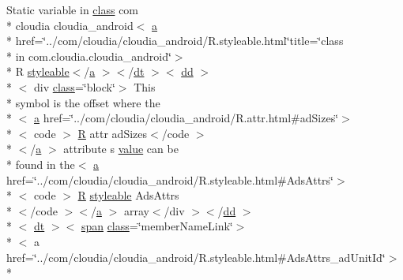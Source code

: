 \begin{DoxyCompactItemize}
 Static variable in \hyperlink{_tools_8html_acf06f836132665ba8114f5a414c2403f}{class} com \\*
cloudia cloudia\-\_\-android$<$ \hyperlink{style_8css_a5e8981582017bb8b84c21f148345d1f7}{a} \\*
href=\char`\"{}../com/cloudia/cloudia\-\_\-android/R.\-styleable.\-html\char`\"{}title=\char`\"{}class \\*
in com.\-cloudia.\-cloudia\-\_\-android\char`\"{}$>$\\*
 R \hyperlink{index-17_8html_ae6c9bf1e41380184b4b665ca9ab6ba0a}{styleable}$<$/\hyperlink{style_8css_a5e8981582017bb8b84c21f148345d1f7}{a} $>$$<$/\hyperlink{stylesheet_8css_a107565fb4039d33b041380d6e0ea1d80}{dt} $>$$<$ \hyperlink{stylesheet_8css_a47f4718a86835a7771ec592ece845221}{dd} $>$\\*
$<$ div \hyperlink{_tools_8html_acf06f836132665ba8114f5a414c2403f}{class}=\char`\"{}block\char`\"{}$>$ This \\*
symbol is the offset where the\\*
$<$ \hyperlink{style_8css_a5e8981582017bb8b84c21f148345d1f7}{a} href=\char`\"{}../com/cloudia/cloudia\-\_\-android/R.\-attr.\-html\#ad\-Sizes\char`\"{}$>$\\*
$<$ code $>$ \hyperlink{index-16_8html_a31e8fe59be5c20ce90a0090e28a0c1fe}{R} attr ad\-Sizes$<$/code $>$\\*
$<$/\hyperlink{style_8css_a5e8981582017bb8b84c21f148345d1f7}{a} $>$ attribute s \hyperlink{_my_s_q_l_connector_8measure_8html_afcc7a4b78ecd8fa7e713f8cfa0f51017}{value} can be \\*
found in the$<$ \hyperlink{style_8css_a5e8981582017bb8b84c21f148345d1f7}{a} href=\char`\"{}../com/cloudia/cloudia\-\_\-android/R.\-styleable.\-html\#Ads\-Attrs\char`\"{}$>$\\*
$<$ code $>$ \hyperlink{index-16_8html_a31e8fe59be5c20ce90a0090e28a0c1fe}{R} \hyperlink{index-17_8html_ae6c9bf1e41380184b4b665ca9ab6ba0a}{styleable} Ads\-Attrs\\*
$<$/code $>$$<$/\hyperlink{style_8css_a5e8981582017bb8b84c21f148345d1f7}{a} $>$ array$<$/div $>$$<$/\hyperlink{stylesheet_8css_a47f4718a86835a7771ec592ece845221}{dd} $>$\\*
$<$ \hyperlink{stylesheet_8css_a107565fb4039d33b041380d6e0ea1d80}{dt} $>$$<$ \hyperlink{stylesheet_8css_a8343996ebcf16220b04e54659aac31cc}{span} \hyperlink{_tools_8html_acf06f836132665ba8114f5a414c2403f}{class}=\char`\"{}member\-Name\-Link\char`\"{}$>$\\*
$<$ a href=\char`\"{}../com/cloudia/cloudia\-\_\-android/R.\-styleable.\-html\#Ads\-Attrs\-\_\-ad\-Unit\-Id\char`\"{}$>$\\*
$$
\end{DoxyCompactItemize}
